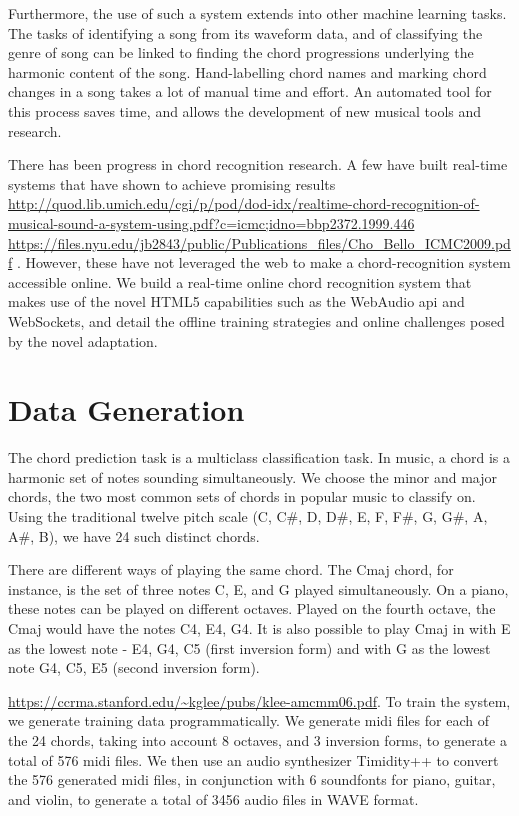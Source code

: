 \documentclass{article}
\begin{document}
Furthermore, the use of such a system extends into other machine learning tasks. The tasks of identifying a song from its waveform data, and of classifying the genre of song can be linked to finding the chord progressions underlying the harmonic content of the song. Hand-labelling chord names and marking chord changes in a song takes a lot of manual time and effort. An automated tool for this process saves time, and allows the development of new musical tools and research.

There has been progress in chord recognition research. A few have built real-time systems that have shown to achieve promising results \url{http://quod.lib.umich.edu/cgi/p/pod/dod-idx/realtime-chord-recognition-of-musical-sound-a-system-using.pdf?c=icmc;idno=bbp2372.1999.446} \url{https://files.nyu.edu/jb2843/public/Publications_files/Cho_Bello_ICMC2009.pdf} . However, these have not leveraged the web to make a chord-recognition system accessible online. We build a real-time online chord recognition system that makes use of the novel HTML5 capabilities such as the WebAudio api and WebSockets, and detail the offline training strategies and online challenges posed by the novel adaptation.

\section{Data Generation}
The chord prediction task is a multiclass classification task. In music, a chord is a harmonic set of notes sounding simultaneously. We choose the minor and major chords, the two most common sets of chords in popular music to classify on. Using the traditional twelve pitch scale (C, C\#, D, D\#, E, F, F\#, G, G\#, A, A\#, B), we have 24 such distinct chords.

There are different ways of playing the same chord. The Cmaj chord, for instance, is the set of three notes C, E, and G played simultaneously. On a piano, these notes can be played on different octaves. Played on the fourth octave, the Cmaj would have the notes C4, E4, G4. It is also possible to play Cmaj in with E as the lowest note - E4, G4, C5 (first inversion form) and with G as the lowest note G4, C5, E5 (second inversion form).

\url{https://ccrma.stanford.edu/~kglee/pubs/klee-amcmm06.pdf}. To train the system, we generate training data programmatically. We generate midi files for each of the 24 chords, taking into account 8 octaves, and 3 inversion forms, to generate a total of 576 midi files. We then use an audio synthesizer Timidity++ to convert the 576 generated midi files, in conjunction with 6 soundfonts for piano, guitar, and violin, to generate a total of 3456 audio files in WAVE format.
\end{document}
